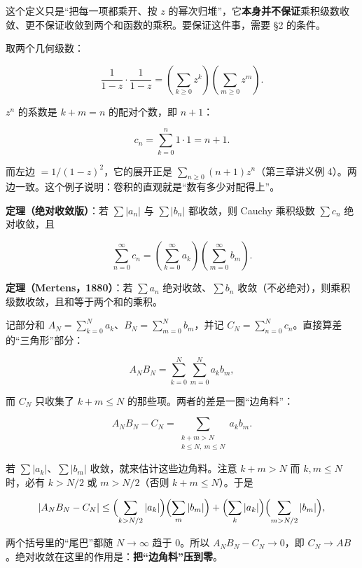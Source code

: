 \documentclass[11pt]{ctexart}
\let\origsubhdr\subhdr
\renewcommand{\subhdr}[1]{\par\needspace{4\baselineskip}\origsubhdr{#1}}
\let\orighdr\hdr
\renewcommand{\hdr}[2]{\par\needspace{9\baselineskip}\orighdr{#1}{#2}}
\begin{document}
这个定义只是“把每一项都乘开、按 $z$ 的幂次归堆”，它\textbf{本身并不保证}乘积级数收敛、更不保证收敛到两个和函数的乘积。要保证这件事，需要 §2 的条件。


取两个几何级数：

\[ \frac{1}{1-z}\cdot\frac{1}{1-z}=\left(\sum_{k\ge0}z^k\right)\left(\sum_{m\ge0}z^m\right) . \]

$z^n$ 的系数是 $k+m=n$ 的配对个数，即 $n+1$：

\[ c_n=\sum_{k=0}^{n}1\cdot1=n+1 . \]

而左边 $=1/(1-z)^2$，它的展开正是 $\sum_{n\ge0}(n+1)z^n$（第三章讲义例 4）。两边一致。这个例子说明：卷积的直观就是“数有多少对配得上”。



\textbf{定理（绝对收敛版）}：若 $\sum|a_n|$ 与 $\sum|b_n|$ 都收敛，则 Cauchy 乘积级数 $\sum c_n$ 绝对收敛，且

\[ \sum_{n=0}^{\infty}c_n=\left(\sum_{k=0}^{\infty}a_k\right)\left(\sum_{m=0}^{\infty}b_m\right) . \]

\textbf{定理（Mertens，1880）}：若 $\sum a_n$ 绝对收敛、$\sum b_n$ 收敛（不必绝对），则乘积级数收敛，且和等于两个和的乘积。



记部分和 $A_N=\sum_{k=0}^{N}a_k$、$B_N=\sum_{m=0}^{N}b_m$，并记 $C_N=\sum_{n=0}^{N}c_n$。直接算差的“三角形”部分：

\[ A_NB_N=\sum_{k=0}^{N}\sum_{m=0}^{N}a_kb_m , \]

而 $C_N$ 只收集了 $k+m\le N$ 的那些项。两者的差是一圈“边角料”：

\[ A_NB_N-C_N=\sum_{\substack{k+m>N\\ k\le N,\ m\le N}}a_kb_m . \]

若 $\sum|a_k|$、$\sum|b_m|$ 收敛，就来估计这些边角料。注意 $k+m>N$ 而 $k,m\le N$ 时，必有 $k>N/2$ 或 $m>N/2$（否则 $k+m\le N$）。于是

\[ \left|A_NB_N-C_N\right|\le\Bigl(\sum_{k>N/2}|a_k|\Bigr)\Bigl(\sum_{m}|b_m|\Bigr)+\Bigl(\sum_{k}|a_k|\Bigr)\Bigl(\sum_{m>N/2}|b_m|\Bigr) , \]

两个括号里的“尾巴”都随 $N\to\infty$ 趋于 0。所以 $A_NB_N-C_N\to0$，即 $C_N\to AB$。绝对收敛在这里的作用是：\textbf{把“边角料”压到零}。
\end{document}
